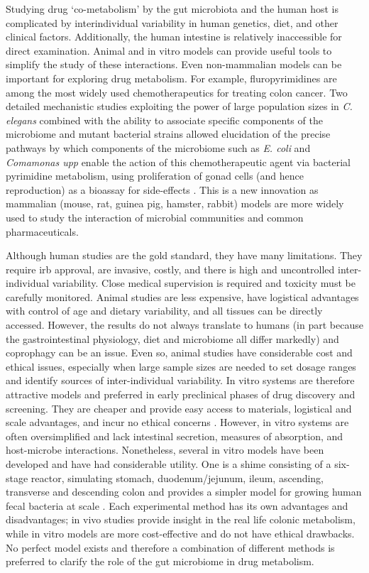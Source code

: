 Studying drug `co-metabolism' by the gut microbiota and the human host is complicated by interindividual variability in human genetics, diet, and other clinical factors. Additionally, the human intestine is relatively inaccessible for direct examination. Animal and in vitro models can provide useful tools to simplify the study of these interactions. Even non-mammalian models can be important for exploring drug metabolism. For example, fluropyrimidines are among the most widely used chemotherapeutics for treating colon cancer. Two detailed mechanistic studies exploiting the power of large population sizes in \textit{C. elegans} combined with the ability to associate specific components of the microbiome and mutant bacterial strains allowed elucidation of the precise pathways by which components of the microbiome such as \textit{E. coli} and \textit{Comamonas upp} enable the action of this chemotherapeutic agent via bacterial pyrimidine metabolism, using proliferation of gonad cells (and hence reproduction) as a bioassay for side-effects \cite{RN4101, RN4100}. This is a new innovation as mammalian (mouse, rat, guinea pig, hamster, rabbit) models are more widely used to study the interaction of microbial communities and common pharmaceuticals. 

Although human studies are the gold standard, they have many limitations. They require \gls{irb} approval, are invasive, costly, and there is high and uncontrolled inter-individual variability. Close medical supervision is required and toxicity must be carefully monitored. Animal studies are less expensive, have logistical advantages with control of age and dietary variability, and all tissues can be directly accessed. However, the results do not always translate to humans (in part because the gastrointestinal physiology, diet and microbiome all differ markedly) and coprophagy can be an issue. Even so, animal studies have considerable cost and ethical issues, especially when large sample sizes are needed to set dosage ranges and identify sources of inter-individual variability. In vitro systems are therefore attractive models and preferred in early preclinical phases of drug discovery and screening. They are cheaper and  provide easy access to materials, logistical and scale advantages, and incur no ethical concerns \cite{RN4136}. However, in vitro systems are often oversimplified and lack intestinal secretion, measures of absorption, and host-microbe interactions. Nonetheless, several in vitro models have been developed and have had considerable utility. One is a \gls{shime} consisting of a six-stage reactor, simulating stomach, duodenum/jejunum, ileum, ascending, transverse and descending colon \cite{RN4137} and provides a simpler model for growing human fecal bacteria at scale \cite{RN4138}. Each experimental method has its own advantages and disadvantages; in vivo studies provide insight in the real life colonic metabolism, while in vitro models are more cost-effective and do not have ethical drawbacks. No perfect model exists and therefore a combination of different methods is preferred to clarify the role of the gut microbiome in drug metabolism. 

